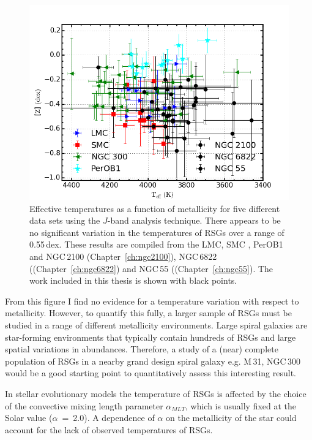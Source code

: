 \begin{figure}
 \centering
\includegraphics[width=\textwidth]{conclusions/RSGTeffvsZ-all}
\caption[Effective temperature as a function of metallicity in different environments]{
Effective temperatures as a function of metallicity for five different data sets using the $J$-band analysis technique.
There appears to be no significant variation in the temperatures of RSGs over a range of 0.55\,dex.
These results are compiled from the LMC, SMC
\protect\citep[blue and red points respectively;][]{2015ApJ...806...21D}, PerOB1
\protect\citep[a Galactic RSG cluster; cyan;][]{2014ApJ...788...58G} and
NGC\,2100 (Chapter~\ref{ch:ngc2100}),
NGC\,6822 ((Chapter~\ref{ch:ngc6822})
and NGC\,55 ((Chapter~\ref{ch:ngc55}).
The work included in this thesis is shown with black points.
\label{fig:TeffvsZ}
         }
\end{figure}

From this figure I find no evidence for a temperature variation with respect to metallicity.
However, to quantify this fully, a larger sample of RSGs must be studied in a range of different metallicity environments.
Large spiral galaxies are star-forming environments that typically contain hundreds of RSGs and large spatial variations in abundances.
Therefore, a study of a (near) complete population of RSGs in a nearby grand design spiral galaxy e.g. M\,31, NGC\,300 would be a good starting point to quantitatively assess this interesting result.

In stellar evolutionary models the temperature of RSGs is affected by the choice of the convective mixing length parameter $\alpha_{MLT}$, which is usually fixed at the Solar value ($\alpha$~=~2.0).
A dependence of $\alpha$ on the metallicity of the star could account for the lack of observed temperatures of RSGs.

